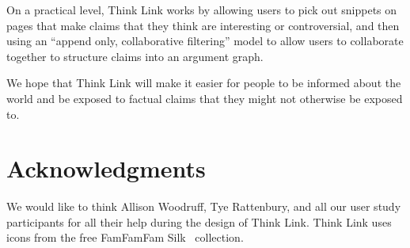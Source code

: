 \documentclass{chi2009}
\begin{document}
On a practical level, Think Link works by allowing users to pick out snippets on pages that make claims that they think are interesting or controversial, and then using an ``append only, collaborative filtering'' model to allow users to collaborate together to structure claims into an argument graph.

We hope that Think Link will make it easier for people to be informed about the world and be exposed to factual claims that they might not otherwise be exposed to.

\section{Acknowledgments}

We would like to think Allison Woodruff, Tye Rattenbury, and all our user study participants for all their help during the design of Think Link. Think Link uses icons from the free FamFamFam Silk~\cite{silkicons} collection.




\end{document}
